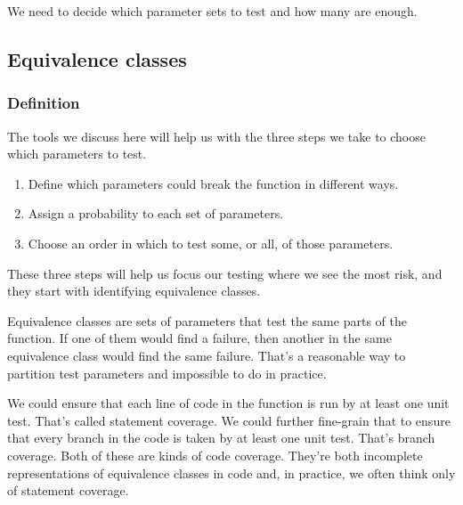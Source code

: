 \documentclass[fleqn,10pt]{olplainarticle}
\begin{document}
We need to decide which parameter sets to test
and how many are enough.

\subsection{Equivalence classes}\label{sec:limits}

\subsubsection{Definition}
% 

The tools we discuss here will help us with the three steps
we take to choose which parameters to test.

\begin{enumerate}
  \item Define which parameters could break the function in different ways.

  \item Assign a probability to each set of parameters.

  \item Choose an order in which to test some, or all, of those
   parameters.
\end{enumerate}

\noindent{}These three steps will help us focus our testing
where we see the most risk, and they start with identifying
equivalence classes.

Equivalence classes are sets of parameters that test the same
parts of the function. If one of them would find a failure,
then another in the same equivalence class would find the same
failure. That's a reasonable way to partition test parameters
and impossible to do in practice.

We could ensure that each line of code in the function is
run by at least one unit test. That's called statement coverage.
We could further fine-grain that to ensure that every branch
in the code is taken by at least one unit test. That's
branch coverage. Both of these are kinds of code coverage.
They're both incomplete representations of equivalence classes
in code and, in practice, we often think only of statement
coverage.
\end{document}

